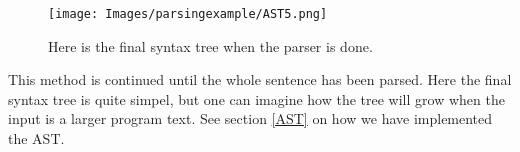 \begin{figure}[H]
\begin{center}
\texttt{[image: Images/parsingexample/AST5.png]}
\end{center}
\caption{Here is the final syntax tree when the parser is done.}
\end{figure}

This method is continued until the whole sentence has been parsed. Here the final syntax tree is quite simpel, but one can imagine how the tree will grow when the input is a larger program text. See section \ref{AST} on how we have implemented the AST.